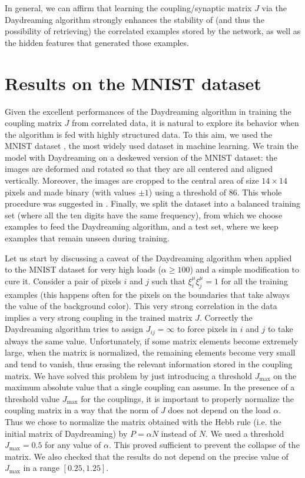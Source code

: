 \documentclass[a4paper]{cas-sc}
\begin{document}
In general, we can affirm that learning the coupling/synaptic matrix $J$ via the Daydreaming algorithm strongly enhances the stability of (and thus the possibility of retrieving) the correlated examples stored by the network, as well as the hidden features that generated those examples.

\section{Results on the MNIST dataset}
\label{sec:results_mnist}
Given the excellent performances of the Daydreaming algorithm in training the coupling matrix $J$ from correlated data, it is natural to explore its behavior when the algorithm is fed with highly structured data.
To this aim, we used the MNIST dataset \cite{lecun1998gradient}, the most widely used dataset in machine learning.
We train the model with Daydreaming on a deskewed version of the MNIST dataset: the images are deformed and rotated so that they are all centered and aligned vertically. Moreover, the images are cropped to the central area of size $14 \times 14$ pixels and made binary (with values $\pm1$) using a threshold of 86. This whole procedure was suggested in \cite{belyaev2020classification}. Finally, we split the dataset into a balanced training set (where all the ten digits have the same frequency), from which we choose examples to feed the Daydreaming algorithm, and a test set, where we keep examples that remain unseen during training.

Let us start by discussing a caveat of the Daydreaming algorithm when applied to the MNIST dataset for very high loads ($\alpha\geq100$) and a simple modification to cure it.
Consider a pair of pixels $i$ and $j$ such that $\xi_i^\mu \xi_j^\mu=1$ for all the training examples (this happens often for the pixels on the boundaries that take always the value of the background color). This very strong correlation in the data implies a very strong coupling in the trained matrix $J$. Correctly the Daydreaming algorithm tries to assign $J_{ij}=\infty$ to force pixels in $i$ and $j$ to take always the same value.
Unfortunately, if some matrix elements become extremely large, when the matrix is normalized, the remaining elements become very small and tend to vanish, thus erasing the relevant information stored in the coupling matrix.
We have solved this problem by just introducing a threshold $J_\mathrm{max}$ on the maximum absolute value that a single coupling can assume.
In the presence of a threshold value $J_\mathrm{max}$ for the couplings, it is important to properly normalize the coupling matrix in a way that the norm of $J$ does not depend on the load $\alpha$. Thus we chose to normalize the matrix obtained with the Hebb rule (i.e. the initial matrix of Daydreaming) by $P = \alpha N$ instead of $N$.
We used a threshold $J_\mathrm{max}=0.5$ for any value of $\alpha$. This proved sufficient to prevent the collapse of the matrix. We also checked that the results do not depend on the precise value of $J_\mathrm{max}$ in a range $[0.25,1.25]$. 
\end{document}
